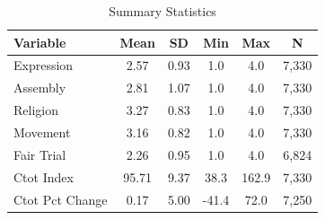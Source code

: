 \begin{table}[htbp]
\centering
\caption{Summary Statistics}
\label{tab:summary}
\begin{tabular}{lccccc}
\toprule
Variable & Mean & SD & Min & Max & N \\
\midrule
  Expression & 2.57 & 0.93 & 1.0 & 4.0 & 7,330 \\
  Assembly & 2.81 & 1.07 & 1.0 & 4.0 & 7,330 \\
  Religion & 3.27 & 0.83 & 1.0 & 4.0 & 7,330 \\
  Movement & 3.16 & 0.82 & 1.0 & 4.0 & 7,330 \\
  Fair Trial & 2.26 & 0.95 & 1.0 & 4.0 & 6,824 \\
  Ctot Index & 95.71 & 9.37 & 38.3 & 162.9 & 7,330 \\
  Ctot Pct Change & 0.17 & 5.00 & -41.4 & 72.0 & 7,250 \\
\bottomrule
\end{tabular}
\end{table}